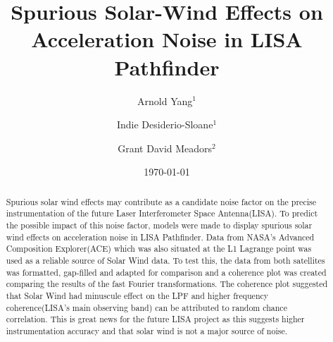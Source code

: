 \documentclass[%
 reprint,
 amsmath,amssymb,
 aps,
]{revtex4-2}
\begin{document}

\title{Spurious Solar-Wind Effects on Acceleration Noise in LISA Pathfinder}%
\author{Arnold Yang\(^1\)}%
\author{Indie Desiderio-Sloane\(^1\)}
 \author{Grant David Meadors\(^2\)}

%

\date{\today}%

\begin{abstract}
Spurious solar wind effects may contribute as a candidate noise factor on the precise instrumentation of the future Laser Interferometer Space Antenna(LISA). To predict the possible impact of this noise factor, models were made to display spurious solar wind effects on acceleration noise in LISA Pathfinder. Data from NASA's Advanced Composition Explorer(ACE) which was also situated at the L1 Lagrange point was used as a reliable source of Solar Wind data. To test this, the data from both satellites was formatted, gap-filled and adapted for comparison and a coherence plot was created comparing the results of the fast Fourier transformations. The coherence plot suggested that Solar Wind had minuscule effect on the LPF and higher frequency coherence(LISA’s main observing band) can be attributed to random chance correlation. This is great news for the future LISA project as this suggests higher instrumentation accuracy and that solar wind is not a major source of noise.
\end{abstract}

\maketitle

\end{document}
